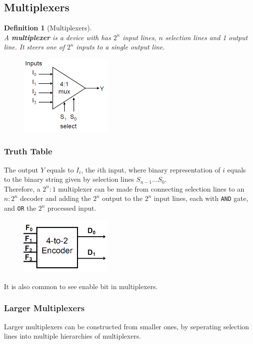 \documentclass[12pt]{article}
\newtheorem{definition}{Definition}[section]
\theoremstyle{definition}
\begin{document}
\subsection{Multiplexers}
\begin{definition}[Multiplexers]
\hfill\\\normalfont A \textbf{multiplexer} is a device with has $2^n$ input lines, $n$ selection lines and 1 output line. It steers one of $2^n$ inputs to a single output line.
\begin{figure}[h]
\centering
\includegraphics[width = 0.4\textwidth]{7_6.png}
\end{figure}
\end{definition}
\subsubsection{Truth Table}
The output $Y$ equals to $I_i$, the $i$th input, where binary representation of $i$ equals to the binary string given by selection lines $S_{n-1}\ldots S_0$.\\
Therefore, a $2^n:1$ multiplexer can be made from connecting selection lines to an $n:2^n$ decoder and adding the $2^n$ output to the $2^n$ input lines, each with \texttt{AND} gate, and \texttt{OR} the $2^n$ processed input.
\begin{figure}[h]
\centering
\includegraphics[width = 0.4\textwidth]{7_7.png}
\end{figure}
It is also common to see enable bit in multiplexers.
\subsubsection{Larger Multiplexers}
Larger multiplexers can be constructed from smaller ones, by seperating selection lines into multiple hierarchies of multiplexers.
\end{document}
